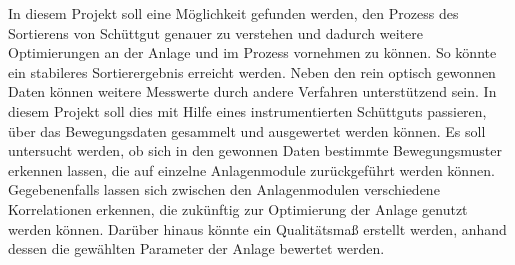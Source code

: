 In diesem Projekt soll eine Möglichkeit gefunden werden, den Prozess des Sortierens von Schüttgut genauer zu verstehen und dadurch weitere Optimierungen an der Anlage und im Prozess vornehmen zu können. So könnte ein stabileres Sortierergebnis erreicht werden. Neben den rein optisch gewonnen Daten können weitere Messwerte durch andere Verfahren unterstützend sein. In diesem Projekt soll dies mit Hilfe eines instrumentierten Schüttguts passieren, über das Bewegungsdaten gesammelt und ausgewertet werden können. Es soll untersucht werden, ob sich in den gewonnen Daten bestimmte Bewegungsmuster erkennen lassen, die auf einzelne Anlagenmodule zurückgeführt werden können. Gegebenenfalls lassen sich zwischen den Anlagenmodulen verschiedene Korrelationen erkennen, die zukünftig zur Optimierung der Anlage genutzt werden können. Darüber hinaus könnte ein Qualitätsmaß erstellt werden, anhand dessen die gewählten Parameter der Anlage bewertet werden.

